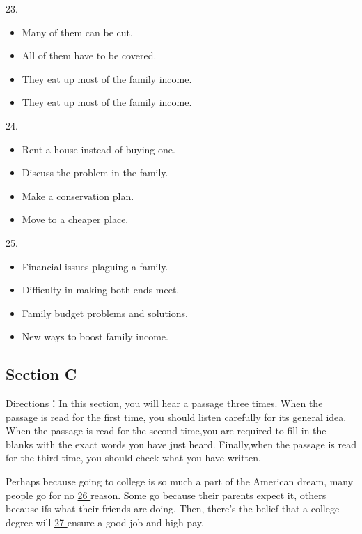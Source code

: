 \documentclass[UTF8,11pt]{ctexart}
\begin{document}
23.


\begin{itemize}[leftmargin=2em,itemsep=.2em,topsep=.4em]\item[A.] Many of them can be cut.
\item[B.] All of them have to be covered.
\item[C.] They eat up most of the family income.
\item[D.] They eat up most of the family income.
\end{itemize}

24.


\begin{itemize}[leftmargin=2em,itemsep=.2em,topsep=.4em]\item[A.] Rent a house instead of buying one.
\item[B.] Discuss the problem in the family.
\item[C.] Make a conservation plan.
\item[D.] Move to a cheaper place.
\end{itemize}

25.


\begin{itemize}[leftmargin=2em,itemsep=.2em,topsep=.4em]\item[A.] Financial issues plaguing a family.
\item[B.] Difficulty in making both ends meet.
\item[C.] Family budget problems and solutions.
\item[D.] New ways to boost family income.
\end{itemize}

\subsection*{Section C}


Directions：In this section, you will hear a passage three times. When the passage is read for the first time, you should listen carefully for its general idea. When the passage is read for the second time,you are required to fill in the blanks with the exact words you have just heard. Finally,when the passage is read for the third time, you should check what you have written.


Perhaps because going to college is so much a part of the American dream, many people go for no \uline{26 }reason. Some go because their parents expect it, others because ifs what their friends are doing. Then, there’s the belief that a college degree will \uline{27 }ensure a good job and high pay.
\end{document}
